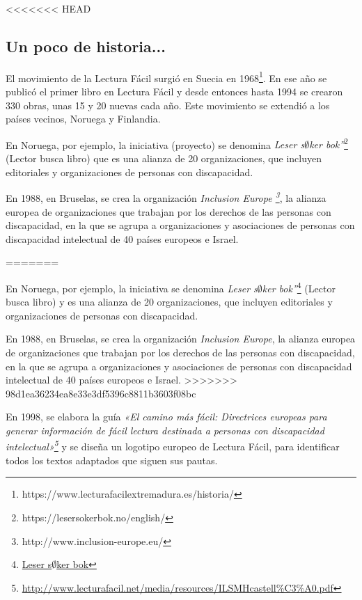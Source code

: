 <<<<<<< HEAD
\subsection{Un poco de historia...}
El movimiento de la Lectura Fácil surgió en Suecia en 1968\footnote{https://www.lecturafacilextremadura.es/historia/}. En ese año se publicó el primer libro en Lectura Fácil y desde entonces hasta 1994 se crearon 330 obras, unas 15 y 20 nuevas cada año. Este movimiento se extendió a los países vecinos, Noruega y Finlandia.

 \setlength{\parskip}{10pt}
 
En Noruega, por ejemplo, la iniciativa (proyecto) se denomina \textit{Leser s$\emptyset$ker bok”}\footnote{https://lesersokerbok.no/english/} (Lector busca libro) que es una alianza de 20 organizaciones, que incluyen editoriales y organizaciones de personas con discapacidad.

 \setlength{\parskip}{10pt}
 
En 1988, en Bruselas, se crea la organización \textit{Inclusion Europe \footnote{http://www.inclusion-europe.eu/}}, la alianza europea de organizaciones que trabajan por los derechos de las personas con discapacidad, en la que se agrupa a organizaciones y asociaciones de personas con discapacidad intelectual de 40 países europeos e Israel.

 \setlength{\parskip}{10pt}
=======
 \setlength{\parskip}{10pt}
 
En Noruega, por ejemplo, la iniciativa se denomina \textit{Leser s$\emptyset$ker bok”}\footnote{\href{https://lesersokerbok.no/english/}{Leser s$\emptyset$ker bok}} (Lector busca libro) y es una alianza de 20 organizaciones, que incluyen editoriales y organizaciones de personas con discapacidad.

 \setlength{\parskip}{10pt}
 
En 1988, en Bruselas, se crea la organización \textit{Inclusion Europe}, la alianza europea de organizaciones que trabajan por los derechos de las personas con discapacidad, en la que se agrupa a organizaciones y asociaciones de personas con discapacidad intelectual de 40 países europeos e Israel.
>>>>>>> 98d1ea36234ea8e33e3df5396c8811b3603f08bc

 \setlength{\parskip}{10pt}

En 1998, se elabora la guía \textit{«El camino más fácil: Directrices europeas para generar información de fácil lectura destinada a personas con discapacidad intelectual»\footnote{\href{http://www.lecturafacil.net/media/resources/ILSMHcastell\%C3\%A0.pdf}{http://www.lecturafacil.net/media/resources/ILSMHcastell\%C3\%A0.pdf}}} y se diseña un logotipo europeo de Lectura Fácil, para identificar todos los textos adaptados que siguen sus pautas.

